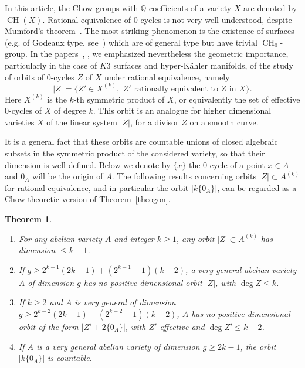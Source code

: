 \documentclass[11pt]{article}
\newtheorem{theo}{Theorem}[section]
\theoremstyle{definition}
\newcommand{\pointir}{.\ ---\ }
\numberwithin{equation}{section}
\numberwithin{figure}{section}
\numberwithin{table}{section}
\DeclareMathOperator{\CH}{CH}
\newenvironment{theoc}{%
\let\oldpointir\pointir%
\renewcommand{\pointir}{}%
\begin{theo}}%
{\end{theo}\let\pointir\oldpointir}
\begin{document}
In this article, the Chow groups with $\mathbb{Q}$-coefficients of a variety $X$ are denoted by $\CH(X)$. Rational equivalence of $0$-cycles is not very well understood, despite Mumford's theorem~\cite{mumford}. The most striking phenomenon is the existence of surfaces (e.g. of Godeaux type, see~\cite{voisingodeaux}) which are of general type but have trivial $\CH_0$-group. In the papers~\cite{voisink3}, \cite{voisinisot}, we emphasized nevertheless the geometric importance, particularly in the case of $K3$ surfaces and hyper-K\"ahler manifolds, of the study of orbits of $0$-cycles $Z$ of $X$ under rational equivalence, namely
\[
| Z|=\{Z'\in X^{(k)},\,\,Z'\,\,\text{rationally equivalent to } Z \text{ in }X\}.
\]
Here $X^{(k)}$ is the $k$-th symmetric product of $X$, or equivalently the set of effective $0$-cycles of $X$ of degree $k$. This orbit is an analogue for higher dimensional varieties $X$ of the linear system $|Z|$, for a divisor $Z$ on a smooth curve.

It is a general fact that these orbits are countable unions of closed algebraic subsets in the symmetric product of the considered variety, so that their dimension is well defined. Below we denote by $\{x\}$ the $0$-cycle of a point $x\in A$ and $0_A$ will be the origin of $A$. The following results concerning orbits $|Z|\subset A^{(k)}$ for rational equivalence, and in particular the orbit $|k\{0_A\}|$, can be regarded as a Chow-theoretic version of Theorem~\ref{theogon}.

\begin{theoc}\ \label{coroorbit}
\begin{enumerate}%
\item \label{1.4.1} For any abelian variety $A$ and integer $k\geq 1$, any orbit $|Z|\subset A^{(k)}$ has dimension $\leq k-1$.

\item \label{1.4.2} If $g\geq 2^{k-1}(2k-1)+(2^{k-1}-1)(k-2)$, a very general abelian variety $A$ of dimension $g$ has no positive-dimensional orbit $|Z|$, with $\deg Z\leq k$.

\item \label{1.4.3} If $k\geq 2$ and $A$ is very general of dimension $g\geq 2^{k-2}(2k-1)+(2^{k-2}-1)(k-2)$, $A$ has no positive-dimensional orbit of the form $|Z'+2\{0_A\}|$, with $Z'$ effective and $\deg Z'\leq k-2$.

\item \label{1.4.4} If $A$ is a very general abelian variety of dimension $g\geq 2k-1$, the orbit $|k\{0_A\}|$ is countable.
\end{enumerate}
\end{theoc}
\end{document}

